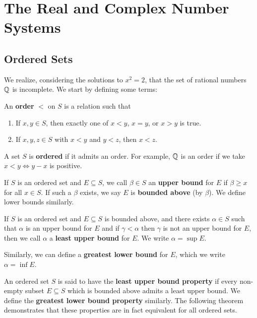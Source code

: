 \chapter{The Real and Complex Number Systems}

\section{Ordered Sets}
We realize, considering the solutions to $x^2 = 2$, that the set of rational numbers $\mathbb{Q}$ is incomplete. We start by defining some terms:
\begin{definition}
An \textbf{order} $<$ on $S$ is a relation such that 
\begin{enumerate}
\item If $x, y \in S$, then exactly one of $x < y$, $x = y$, or $x > y$ is true.
\item If $x, y, z \in S$ with $x < y$ and $y < z$, then $x < z$. 
\end{enumerate}

A set $S$ is \textbf{ordered} if it admits an order. For example, $\mathbb{Q}$ is an order if we take $x < y \iff y - x$ is positive. 

If $S$ is an ordered set and $E \subseteq S$, we call $\beta \in S$ an \textbf{upper bound} for $E$ if $\beta \ge x$ for all $x \in S$. If such a $\beta$ exists, we say $E$ is \textbf{bounded above} (by $\beta$). We define lower bounds similarly. 

If $S$ is an ordered set and $E \subseteq S$ is bounded above, and there exists $\alpha \in S$ such that $\alpha$ is an upper bound for $E$ and if $\gamma < \alpha$ then $\gamma$ is not an upper bound for $E$, then we call $\alpha$ a \textbf{least upper bound} for $E$. We write $\alpha = \sup E$.

Similarly, we can define a \textbf{greatest lower bound} for $E$, which we write $\alpha = \inf E$. 

An ordered set $S$ is said to have the \textbf{least upper bound property} if every non-empty subset $E \subseteq S$ which is bounded above admits a least upper bound. We define the \textbf{greatest lower bound property} similarly. The following theorem demonstrates that these properties are in fact equivalent for all ordered sets.
\end{definition}


